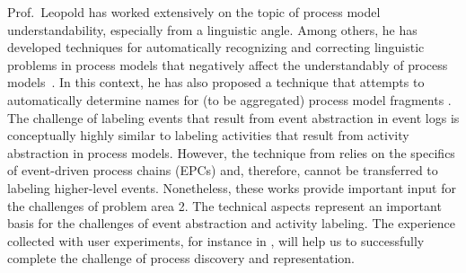 Prof.\ Leopold has worked extensively on the topic of process model understandability, especially from a linguistic angle. Among others, he has developed techniques for automatically recognizing and correcting linguistic problems in process models that negatively affect the understandably of process models~\cite{leopold2013detection,leopold2012refactoring,pittke2015automatic}. In this context, he has also proposed a technique that attempts to automatically determine names for (to be aggregated) process model fragments \cite{leopold2014simplifying}.  The challenge of labeling events that result from event abstraction in event logs is conceptually highly similar to labeling activities that result from activity abstraction in process models. However, the technique from \cite{leopold2014simplifying} relies on the specifics of event-driven process chains (EPCs) and, therefore, cannot be transferred to labeling higher-level events. Nonetheless, these works provide important input for the challenges of problem area 2. The technical aspects represent an important basis for the challenges of event abstraction and activity labeling. The experience collected with user experiments, for instance in \cite{pittke2015automatic}, will help us to successfully complete the challenge of process discovery and representation. 

